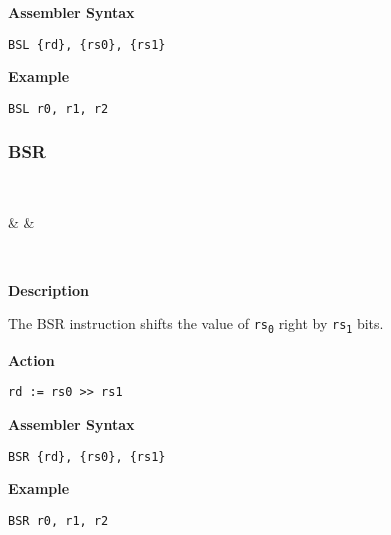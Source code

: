 \vspace{3ex}

\textbf{Assembler Syntax}
\begin{lstlisting}[frame=single]
	BSL {rd}, {rs0}, {rs1}
\end{lstlisting}

\vspace{3ex}

\textbf{Example}
\begin{lstlisting}[frame=single]
	BSL r0, r1, r2
\end{lstlisting}

\subsubsection{BSR }\label{sec:BSR}

\vspace{3ex}

\begin{center}
	\begin{bytefield}[leftcurly=., leftcurlyspace=0pt]{32}
		 \\
		\begin{leftwordgroup}{}
			 & 
			 &
		\end{leftwordgroup}\\
	\end{bytefield}
\end{center}

\textbf{Description}

The BSR instruction shifts the value of \texttt{rs\textsubscript{0}} right by \texttt{rs\textsubscript{1}} bits.

\vspace{3ex}

\textbf{Action}
\begin{lstlisting}[frame=single]
	rd := rs0 >> rs1
\end{lstlisting}

\vspace{3ex}

\textbf{Assembler Syntax}
\begin{lstlisting}[frame=single]
	BSR {rd}, {rs0}, {rs1}
\end{lstlisting}

\vspace{3ex}

\textbf{Example}
\begin{lstlisting}[frame=single]
	BSR r0, r1, r2
\end{lstlisting}
